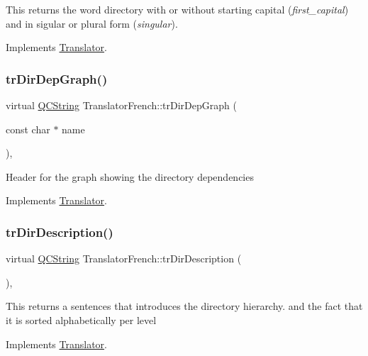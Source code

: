 This returns the word directory with or without starting capital ({\itshape first\+\_\+capital}) and in sigular or plural form ({\itshape singular}). 

Implements \mbox{\hyperlink{class_translator}{Translator}}.

\mbox{\label{class_translator_french_aff8fbc1e24d7d6a643cf0d0b0c9aac43}} 
\subsubsection{\texorpdfstring{trDirDepGraph()}{trDirDepGraph()}}
{\footnotesize\ttfamily virtual \mbox{\hyperlink{class_q_c_string}{Q\+C\+String}} Translator\+French\+::tr\+Dir\+Dep\+Graph (\begin{DoxyParamCaption}\item[{const char $\ast$}]{name }\end{DoxyParamCaption})\hspace{0.3cm}{\ttfamily [inline]}, {\ttfamily [virtual]}}

Header for the graph showing the directory dependencies 

Implements \mbox{\hyperlink{class_translator}{Translator}}.

\mbox{\label{class_translator_french_ae2bf1e2b3284502aaae39d257779681a}} 
\subsubsection{\texorpdfstring{trDirDescription()}{trDirDescription()}}
{\footnotesize\ttfamily virtual \mbox{\hyperlink{class_q_c_string}{Q\+C\+String}} Translator\+French\+::tr\+Dir\+Description (\begin{DoxyParamCaption}{ }\end{DoxyParamCaption})\hspace{0.3cm}{\ttfamily [inline]}, {\ttfamily [virtual]}}

This returns a sentences that introduces the directory hierarchy. and the fact that it is sorted alphabetically per level 

Implements \mbox{\hyperlink{class_translator}{Translator}}.

